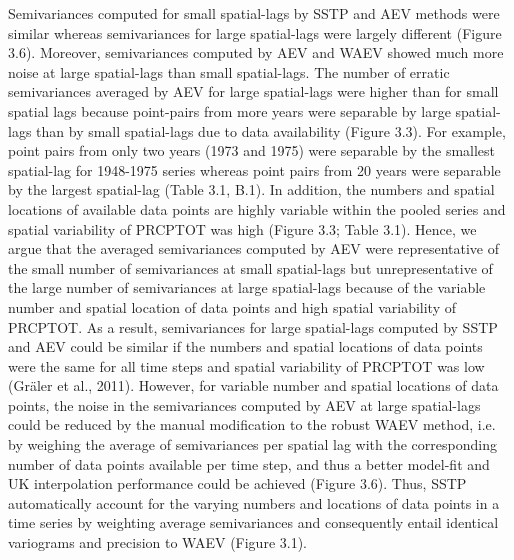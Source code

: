Semivariances computed for small spatial-lags by SSTP and AEV methods were similar whereas semivariances for large spatial-lags were largely different (Figure 3.6). Moreover, semivariances computed by AEV and WAEV showed much more noise at large spatial-lags than small spatial-lags. The number of erratic semivariances averaged by AEV for large spatial-lags were higher than for small spatial lags because point-pairs from more years were separable by large spatial-lags than by small spatial-lags due to data availability (Figure 3.3). For example, point pairs from only two years (1973 and 1975) were separable by the smallest spatial-lag for 1948-1975 series whereas point pairs from 20 years were separable by the largest spatial-lag (Table 3.1, B.1). In addition, the numbers and spatial locations of available data points are highly variable within the pooled series and spatial variability of PRCPTOT was high (Figure 3.3; Table 3.1). Hence, we argue that the averaged semivariances computed by AEV were representative of the small number of semivariances at small spatial-lags but unrepresentative of the large number of semivariances at large spatial-lags because of the variable number and spatial location of data points and high spatial variability of PRCPTOT. As a result, semivariances for large spatial-lags computed by SSTP and AEV could be similar if the numbers and spatial locations of data points were the same for all time steps and spatial variability of PRCPTOT was low (Gräler et al., 2011). However, for variable number and spatial locations of data points, the noise in the semivariances computed by AEV at large spatial-lags could be reduced by the manual modification to the robust WAEV method, i.e. by weighing the average of semivariances per spatial lag with the corresponding number of data points available per time step, and thus a better model-fit and UK interpolation performance could be achieved (Figure 3.6). Thus, SSTP automatically account for the varying numbers and locations of data points in a time series by weighting average semivariances and consequently entail identical variograms and precision to WAEV (Figure 3.1).


